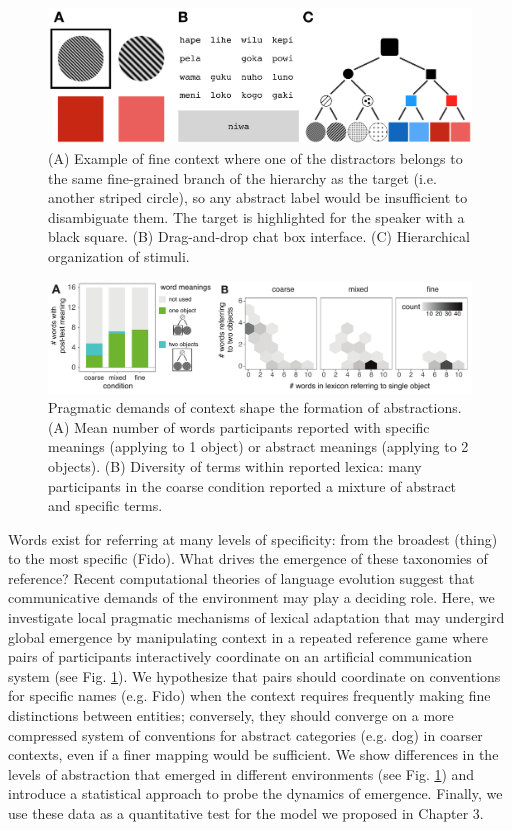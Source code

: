 \documentclass[12pt, donotrepeattitle, man, floatsintext]{apa6}
\begin{document}
\begin{figure}[b]
\centering
\includegraphics[scale=.5]{fig.png}
\caption{(A) Example of fine context where one of the distractors belongs to the same fine-grained branch of the hierarchy as the target (i.e. another striped circle), so any abstract label would be insufficient to disambiguate them. The target is highlighted for the speaker with a black square. (B) Drag-and-drop chat box interface. (C) Hierarchical organization of stimuli.}
\label{fig:2018task}
\end{figure}

\begin{figure}[t]
\centering
\includegraphics[scale=.7]{resultsFig_v1.pdf}
\caption{ Pragmatic demands of context shape the formation of abstractions. (A) Mean number of words participants reported
with specific meanings (applying to 1 object) or abstract meanings (applying to 2 objects). (B) Diversity of terms within
reported lexica: many participants in the coarse condition reported a mixture of abstract and specific terms.}
\label{fig:modelresults}
\end{figure}

Words exist for referring at many levels of specificity: from the broadest (thing) to the most specific (Fido). What drives the emergence of these taxonomies of reference? Recent computational theories of language evolution suggest that communicative demands of the environment may play a deciding role. Here, we investigate local pragmatic mechanisms of lexical adaptation that may undergird global emergence by manipulating context in a repeated reference game where pairs of participants interactively coordinate on an artificial communication system (see Fig. \ref{fig:2018task}). We hypothesize that pairs should coordinate on conventions for specific names (e.g. Fido) when the context requires frequently making fine distinctions between entities; conversely, they should converge on a more compressed system of conventions for abstract categories (e.g. dog) in coarser contexts, even if a finer mapping would be sufficient. We show differences in the levels of abstraction that emerged in different environments (see Fig. \ref{fig:2018task}) and introduce a statistical approach to probe the dynamics of emergence. Finally, we use these data as a quantitative test for the model we proposed in Chapter 3. 
\end{document}
